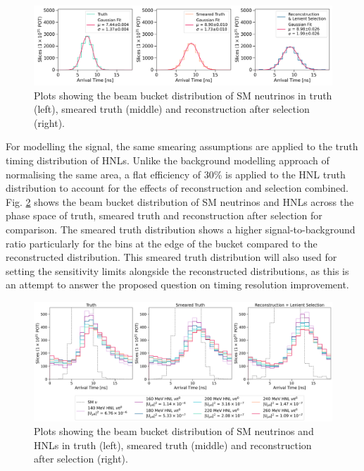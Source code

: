 \begin{figure}[ht!]
    \centering
    \includegraphics[width=\textwidth]{truth_smear_reco_gaus.png}
    \caption{Plots showing the beam bucket distribution of SM neutrinos in truth (left), smeared truth (middle) and reconstruction after selection (right).}
    \label{fig:gaus_truth_smear}
\end{figure}

For modelling the signal, the same smearing assumptions are applied to the truth timing distribution of HNLs. 
Unlike the background modelling approach of normalising the same area, a flat efficiency of 30\% is applied to the HNL truth distribution to account for the effects of reconstruction and selection combined.
Fig. \ref{fig:hnl_sm_smear} shows the beam bucket distribution of SM neutrinos and HNLs across the phase space of truth, smeared truth and reconstruction after selection for comparison. 
The smeared truth distribution shows a higher signal-to-background ratio particularly for the bins at the edge of the bucket compared to the reconstructed distribution.
This smeared truth distribution will also used for setting the sensitivity limits alongside the reconstructed distributions, as this is an attempt to answer the proposed question on timing resolution improvement.

\begin{figure}[ht!]
    \centering
    \includegraphics[width=\textwidth]{truth_smear_zoom.png}
    \caption{Plots showing the beam bucket distribution of SM neutrinos and HNLs in truth (left), smeared truth (middle) and reconstruction after selection (right).}
    \label{fig:hnl_sm_smear}
\end{figure}

